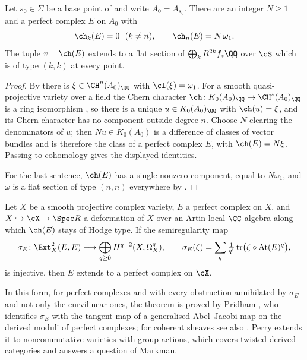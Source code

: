 \begin{proposition}\label{prop:ktheory}
Let $s_{0}\in\Sigma$ be a base point of  and write
$A_{0}=A_{s_{0}}$. There are an integer $N\ge1$ and a perfect complex $E$ on
$A_{0}$ with
\[
  \ch_{k}(E)=0\ \ (k\ne n),\qquad \ch_{n}(E)=N\,\omega_{1} .
\]
The tuple $v=\ch(E)$ extends to a flat section of
$\bigoplus_{k}R^{2k}f_{*}\QQ$ over $\cS$ which is of type $(k,k)$ at every
point.
\end{proposition}

\begin{proof}
By  there is $\xi\in\CH^{n}(A_{0})_{\QQ}$ with
$\cl(\xi)=\omega_{1}$. For a smooth quasi-projective variety over a field the
Chern character $\ch\colon K_{0}(A_{0})_{\QQ}\to\CH^{*}(A_{0})_{\QQ}$ is a
ring isomorphism \cite[Ex.~15.2.16(b) and Cor.~18.3.2]{Ful98}, so there is a
unique $u\in K_{0}(A_{0})_{\QQ}$ with $\ch(u)=\xi$, and its Chern character
has no component outside degree $n$. Choose $N$ clearing the denominators of
$u$; then $Nu\in K_{0}(A_{0})$ is a difference of classes of vector bundles
and is therefore the class of a perfect complex $E$, with
$\ch(E)=N\xi$. Passing to cohomology gives the displayed identities.

For the last sentence, $\ch(E)$ has a single nonzero component, equal to
$N\omega_{1}$, and $\omega$ is a flat section of type $(n,n)$ everywhere by
.
\end{proof}

\begin{theorem}\label{thm:BF}
Let $X$ be a smooth projective complex variety, $E$ a perfect complex on $X$,
and $X\hookrightarrow\cX\to\Spec R$ a deformation of $X$ over an Artin local
$\CC$-algebra along which $\ch(E)$ stays of Hodge type. If the semiregularity
map
\[
  \sigma_{E}\colon\Ext^{2}_{X}(E,E)
  \longrightarrow\bigoplus_{q\ge0}H^{q+2}(X,\Omega^{q}_{X}),
  \qquad
  \sigma_{E}(\zeta)=\sum_{q}\tfrac{1}{q!}\,
    \mathrm{tr}\bigl(\zeta\circ\mathrm{At}(E)^{q}\bigr),
\]
is injective, then $E$ extends to a perfect complex on $\cX$.
\end{theorem}

In this form, for perfect complexes and with every obstruction annihilated by
$\sigma_{E}$ and not only the curvilinear ones, the theorem is proved by
Pridham \cite{Pri24}, who identifies $\sigma_{E}$ with the tangent map of a
generalised Abel--Jacobi map on the derived moduli of perfect complexes; for
coherent sheaves see also \cite{BLM23}. Perry \cite{Per26} extends it to
noncommutative varieties with group actions, which covers twisted derived
categories and answers a question of Markman.

